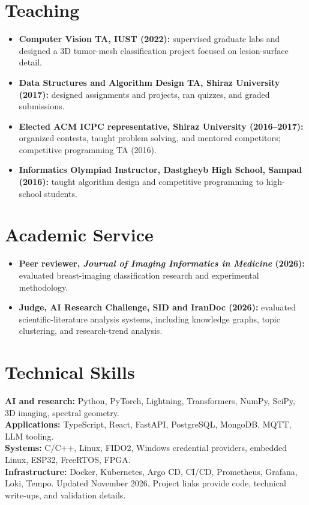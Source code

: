 \documentclass[10pt,a4paper]{article}
\begin{document}
\section{Teaching}
\begin{itemize}
\item \textbf{Computer Vision TA, IUST (2022):} supervised graduate labs and designed a 3D tumor-mesh classification project focused on lesion-surface detail.
\item \textbf{Data Structures and Algorithm Design TA, Shiraz University (2017):} designed assignments and projects, ran quizzes, and graded submissions.
\item \textbf{Elected ACM ICPC representative, Shiraz University (2016--2017):} organized contests, taught problem solving, and mentored competitors; competitive programming TA (2016).
\item \textbf{Informatics Olympiad Instructor, Dastgheyb High School, Sampad (2016):} taught algorithm design and competitive programming to high-school students.
\end{itemize}

\section{Academic Service}
\begin{itemize}
\item \textbf{Peer reviewer, \textit{Journal of Imaging Informatics in Medicine} (2026):} evaluated breast-imaging classification research and experimental methodology.
\item \textbf{Judge, AI Research Challenge, SID and IranDoc (2026):} evaluated scientific-literature analysis systems, including knowledge graphs, topic clustering, and research-trend analysis.
\end{itemize}

\section{Technical Skills}
\textbf{AI and research:} Python, PyTorch, Lightning, Transformers, NumPy, SciPy, 3D imaging, spectral geometry.\\
\textbf{Applications:} TypeScript, React, FastAPI, PostgreSQL, MongoDB, MQTT, LLM tooling.\\
\textbf{Systems:} C/C++, Linux, FIDO2, Windows credential providers, embedded Linux, ESP32, FreeRTOS, FPGA.\\
\textbf{Infrastructure:} Docker, Kubernetes, Argo CD, CI/CD, Prometheus, Grafana, Loki, Tempo.
\vfill
{\footnotesize\color{gray}Updated November 2026. Project links provide code, technical write-ups, and validation details.}
\end{document}
